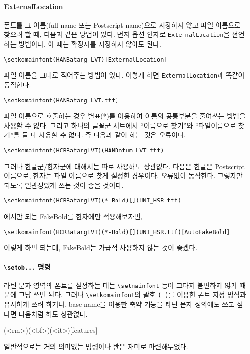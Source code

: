 \documentclass[
	12pt,
	a4paper,
	kosection,
	footnote,
	nobookmarks,
	microtype,
]{oblivoir}
\def\cs#1{\texttt{\textbackslash #1}}
\def\ct#1{\texttt{#1}}
\begin{document}
\paragraph{ExternalLocation}
폰트를 그 이름(full name 또는 Postscript name)으로 지정하지 않고 파일 이름으로 찾으려 할 때,
다음과 같은 방법이 있다.
먼저 옵션 인자로 \texttt{ExternalLocation}을 선언하는 방법이다. 이 때는 확장자를 지정하지 않아도 된다.
\begin{verbatim}
\setkomainfont(HANBatang-LVT)[ExternalLocation]
\end{verbatim}
파일 이름을 그대로 적어주는 방법이 있다. 이렇게 하면 \texttt{ExternalLocation}과 똑같이 동작한다.
\begin{verbatim}
\setkomainfont(HANBatang-LVT.ttf)
\end{verbatim}

파일 이름으로 호출하는 경우 별표(*)를 이용하여 이름의 공통부분을 줄여쓰는 방법을 사용할 수 없다.
그리고 
하나의 글꼴군 세트에서 ``이름으로 찾기''와 ``파일이름으로 찾기''를 둘 다 사용할 수 없다. 즉 다음과 같이 하는 것은 오류이다.
\begin{verbatim}
\setkomainfont(HCRBatangLVT)(HANDotum-LVT.ttf)
\end{verbatim}
그러나 한글군/한자군에 대해서는 따로 사용해도 상관없다. 다음은 한글은 Postscript 이름으로,
한자는 파일 이름으로 찾게 설정한 경우이다. 오류없이 동작한다. 그렇지만 되도록 일관성있게 쓰는 것이 좋을 것이다.
\begin{verbatim}
\setkomainfont(HCRBatangLVT)(*-Bold)[](UNI_HSR.ttf)
\end{verbatim}
\XeTeX 에서만 되는 FakeBold를 한자에만 적용해보자면,
\begin{verbatim}
\setkomainfont(HCRBatangLVT)(*-Bold)[](UNI_HSR.ttf)[AutoFakeBold]
\end{verbatim}
이렇게 하면 되는데, FakeBold는 가급적 사용하지 않는 것이 좋겠다.

\paragraph{\cs{setob...} 명령}

라틴 문자 영역의 폰트를 설정하는 데는 \cs{setmainfont} 등이 그다지 불편하지 않기 때문에
그냥 쓰면 된다. 그러나 \cs{setkomainfont}의 괄호 \ct{( )}를 이용한 폰트 지정 방식과
유사하게 쓰려 하거나, base name을 이용한 축약 기능을 라틴 문자 정의에도 쓰고 싶다면 다음처럼 해도 상관없다.
\begin{boxedverbatim}
(<rm>)(<bf>)(<it>)[features]
\end{boxedverbatim}
일반적으로는 거의 의미없는 명령이나 반은 재미로 마련해두었다.
\end{document}
